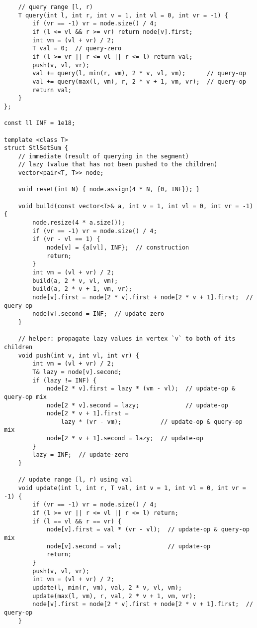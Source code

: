 \documentclass[twoside]{article}
\begin{document}
\begin{multicols*}{2}
\begin{verbatim}
    // query range [l, r)
    T query(int l, int r, int v = 1, int vl = 0, int vr = -1) {
        if (vr == -1) vr = node.size() / 4;
        if (l <= vl && r >= vr) return node[v].first;
        int vm = (vl + vr) / 2;
        T val = 0;  // query-zero
        if (l >= vr || r <= vl || r <= l) return val;
        push(v, vl, vr);
        val += query(l, min(r, vm), 2 * v, vl, vm);      // query-op
        val += query(max(l, vm), r, 2 * v + 1, vm, vr);  // query-op
        return val;
    }
};

const ll INF = 1e18;

template <class T>
struct StlSetSum {
    // immediate (result of querying in the segment)
    // lazy (value that has not been pushed to the children)
    vector<pair<T, T>> node;

    void reset(int N) { node.assign(4 * N, {0, INF}); }

    void build(const vector<T>& a, int v = 1, int vl = 0, int vr = -1) {
        node.resize(4 * a.size());
        if (vr == -1) vr = node.size() / 4;
        if (vr - vl == 1) {
            node[v] = {a[vl], INF};  // construction
            return;
        }
        int vm = (vl + vr) / 2;
        build(a, 2 * v, vl, vm);
        build(a, 2 * v + 1, vm, vr);
        node[v].first = node[2 * v].first + node[2 * v + 1].first;  // query op
        node[v].second = INF;  // update-zero
    }

    // helper: propagate lazy values in vertex `v` to both of its children
    void push(int v, int vl, int vr) {
        int vm = (vl + vr) / 2;
        T& lazy = node[v].second;
        if (lazy != INF) {
            node[2 * v].first = lazy * (vm - vl);  // update-op & query-op mix
            node[2 * v].second = lazy;             // update-op
            node[2 * v + 1].first =
                lazy * (vr - vm);           // update-op & query-op mix
            node[2 * v + 1].second = lazy;  // update-op
        }
        lazy = INF;  // update-zero
    }

    // update range [l, r) using val
    void update(int l, int r, T val, int v = 1, int vl = 0, int vr = -1) {
        if (vr == -1) vr = node.size() / 4;
        if (l >= vr || r <= vl || r <= l) return;
        if (l == vl && r == vr) {
            node[v].first = val * (vr - vl);  // update-op & query-op mix
            node[v].second = val;             // update-op
            return;
        }
        push(v, vl, vr);
        int vm = (vl + vr) / 2;
        update(l, min(r, vm), val, 2 * v, vl, vm);
        update(max(l, vm), r, val, 2 * v + 1, vm, vr);
        node[v].first = node[2 * v].first + node[2 * v + 1].first;  // query-op
    }


\end{verbatim}
\end{multicols*}
\end{document}
